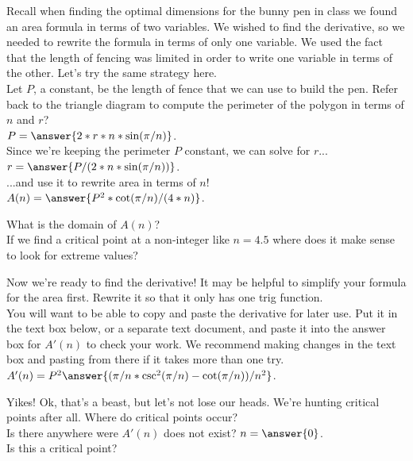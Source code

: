 \documentclass[handout,nooutcomes]{ximera}
\begin{document}
\bigskip

\hspace{2cm}Recall when finding the optimal dimensions for the bunny pen in class we found an area formula in terms of two variables. We wished to find the derivative, so we needed to rewrite the formula in terms of only one variable. We used the fact that the length of fencing was limited in order to write one variable in terms of the other. Let's try the same strategy here.\\
Let $P$, a constant, be the length of fence that we can use to build the pen. Refer back to the triangle diagram to compute the perimeter of the polygon in terms of $n$ and $r$?\\
$P = \answer{2*r*n*\sin(\pi/n)}$.\\
Since we're keeping the perimeter $P$ constant, we can solve for $r$...\\
$r = \answer{P/(2*n*\sin(\pi/n))}$.\\
...and use it to rewrite area in terms of $n$!
$A(n) = \answer{P^2*\cot(\pi/n)/(4*n)}$.\\

\bigskip

\hspace{2cm}What is the domain of $A(n)$? \\ %
If we find a critical point at a non-integer like $n = 4.5$ where does it make sense to look for extreme values?\\ %

\bigskip

\hspace{2cm}Now we're ready to find the derivative! It may be helpful to simplify your formula for the area first. Rewrite it so that it only has one trig function.\\
You will want to be able to copy and paste the derivative for later use. Put it in the text box below, or a separate text document, and paste it into the answer box for $A'(n)$ to check your work. We recommend making changes in the text box and pasting from there if it takes more than one try.\\
$A'(n) = P^2\answer{(\pi/n*\csc^2(\pi/n)-\cot(\pi/n))/n^2}$.\\

\bigskip

\hspace{2cm}Yikes! Ok, that's a beast, but let's not lose our heads. We're hunting critical points after all. Where do critical points occur?\\ %
Is there anywhere were $A'(n)$ does not exist? $n = \answer{0}$.\\
Is this a critical point?\\ %
\end{document}
